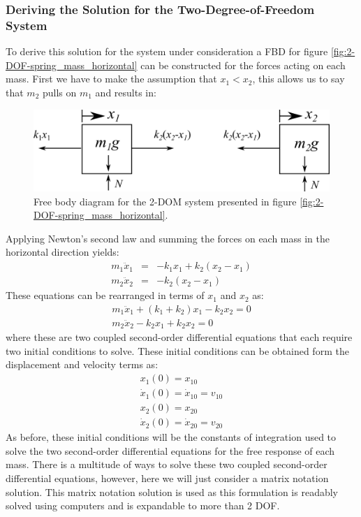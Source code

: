 \documentclass[12pt,letter]{article}
\numberwithin{ex}{section} %
\numberwithin{re}{section} %
\begin{document}
\subsubsection{Deriving the Solution for the Two-Degree-of-Freedom System}
\label{sec:2-DOF_derive_solution}
To derive this solution for the system under consideration a FBD for figure \ref{fig:2-DOF-spring_mass_horizontal} can be constructed for the forces acting on each mass. First we have to make the assumption that $x_1 < x_2$, this allows us to say that $m_2$ pulls on $m_1$ and results in:
\begin{figure}[H]
	\centering
	\includegraphics[]{../Figures/2-DOF-spring_mass_horizontal_FBD.png}
	\caption{Free body diagram for the 2-DOM system presented in figure \ref{fig:2-DOF-spring_mass_horizontal}.}
	\label{fig:2-DOF-spring_mass_horizontal_FBD}
\end{figure}
\noindent Applying Newton's second law and summing the forces on each mass in the horizontal direction yields:
\begin{eqnarray}
m_1\ddot{x}_1 &= & -k_1x_1 + k_2(x_2-x_1) \\
m_2\ddot{x}_2&= & -k_2(x_2-x_1)  \nonumber
\end{eqnarray}
These equations can be rearranged in terms of  $x_1$ and $x_2$ as:
\begin{eqnarray}
m_1\ddot{x}_1 +(k_1+k_2)x_1 -k_2x_2 =0 \\
m_2\ddot{x}_2 - k_2x_1 + k_2x_2 = 0 \nonumber
\end{eqnarray}
where these are two coupled second-order differential equations that each require two initial conditions to solve. These initial conditions can be obtained form the displacement and velocity terms as:
\begin{eqnarray}
x_1(0) = x_{10} \\
\dot{x}_1(0) = \dot{x}_{10} = v_{10} \nonumber \\ 
x_2(0) = x_{20} \nonumber \\ 
\dot{x}_2(0) = \dot{x}_{20} = v_{20} \nonumber
\end{eqnarray}
As before, these initial conditions will be the constants of integration used to solve the two second-order differential equations for the free response of each mass. There is a multitude of ways to solve these two coupled  second-order differential equations, however, here we will just consider a matrix notation solution. This matrix notation solution is used as this formulation is readably solved using computers and is expandable to more than 2 DOF.
\end{document}
